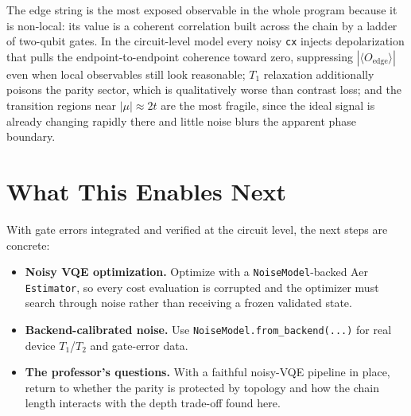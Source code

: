 \documentclass[11pt]{article}
\begin{document}
The edge string is the most exposed observable in the whole program because it is non-local: its value is a coherent correlation built across the chain by a ladder of two-qubit gates. In the circuit-level model every noisy \texttt{cx} injects depolarization that pulls the endpoint-to-endpoint coherence toward zero, suppressing $|\langle O_{\mathrm{edge}}\rangle|$ even when local observables still look reasonable; $T_1$ relaxation additionally poisons the parity sector, which is qualitatively worse than contrast loss; and the transition regions near $|\mu|\approx2t$ are the most fragile, since the ideal signal is already changing rapidly there and little noise blurs the apparent phase boundary.

\section{What This Enables Next}

With gate errors integrated and verified at the circuit level, the next steps are concrete:
\begin{itemize}
  \item \textbf{Noisy VQE optimization.} Optimize with a \texttt{NoiseModel}-backed Aer \texttt{Estimator}, so every cost evaluation is corrupted and the optimizer must search through noise rather than receiving a frozen validated state.
  \item \textbf{Backend-calibrated noise.} Use \texttt{NoiseModel.from\_backend(...)} for real device $T_1$/$T_2$ and gate-error data.
  \item \textbf{The professor's questions.} With a faithful noisy-VQE pipeline in place, return to whether the parity is protected by topology and how the chain length interacts with the depth trade-off found here.
\end{itemize}
\end{document}

